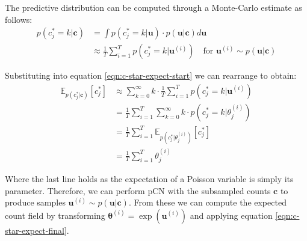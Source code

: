 \documentclass[]{article}
\newcommand{\Expect}{\mathbb{E}}
\newcommand{\cbold}{\boldsymbol{c}}
\newcommand{\ubold}{\boldsymbol{u}}
\newcommand{\thetabold}{\boldsymbol{\theta}}
\begin{document}
The predictive distribution can be computed through a Monte-Carlo estimate as follows:
%
\begin{align}
	p(c_j^* = k | \cbold) &= \int p(c_j^* = k | \ubold) \cdot p(\ubold | \cbold) d\ubold \nonumber \\
	&\approx \frac{1}{T} \sum_{i=1}^{T} p(c_j^* = k | \ubold^{(i)}) \quad \textrm{for } \ubold^{(i)} \sim p(\ubold | \cbold)
\end{align}

Substituting into equation \ref{eqn:c-star-expect-start} we can rearrange to obtain:
%
\begin{align}
	\Expect_{p(c_j^*| \cbold)}[c_j^*] &\approx \sum_{k=0}^{\infty} k \cdot \frac{1}{T} \sum_{i=1}^{T} p(c_j^* = k | \ubold^{(i)}) \nonumber \\
	&= \frac{1}{T} \sum_{i=1}^{T} \sum_{k=0}^{\infty} k \cdot p(c^*_j = k | \theta^{(i)}_j) \nonumber \\
	&= \frac{1}{T} \sum_{i=1}^{T} \Expect_{p(c_j^*| \theta_j^{(i)})} [c_j^*] \nonumber \\
	&= \frac{1}{T} \sum_{i=1}^{T} \theta_j^{(i)} \label{eqn:c-star-expect-final}
\end{align}

Where the last line holds as the expectation of a Poisson variable is simply its parameter. Therefore, we can perform pCN with the subsampled counts $\cbold$ to produce samples $\ubold^{(i)} \sim p(\ubold | \cbold)$. From these we can compute the expected count field by transforming $\thetabold^{(i)} = \exp (\ubold^{(i)})$ and applying equation \ref{eqn:c-star-expect-final}.
\end{document}
